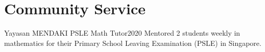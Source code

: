 \documentclass[../main.tex]{subfiles}
\begin{document}
\section{Community Service}
  \vspace{2pt}
  \resumeSubHeadingListStart

    \layoutAwards
    {Yayasan MENDAKI PSLE Math Tutor}{2020}
    {Mentored 2 students weekly in mathematics for their Primary School Leaving Examination (PSLE) in Singapore.}

  \resumeSubHeadingListEnd
\end{document}
